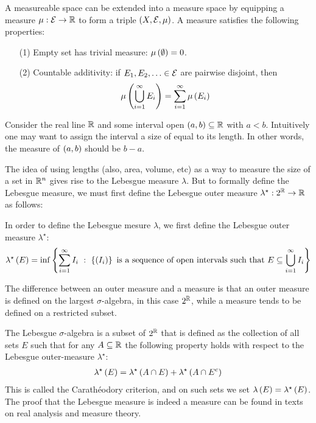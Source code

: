 A measureable space can be extended into a measure space by equipping a
measure \(\mu : \mathcal{E} \to \mathbb{R}\) to form a triple
\(\left(X, \mathcal{E}, \mu\right)\).
A measure satisfies the following properties:
\begin{enumerate}
  \item[(1)]
    Empty set has trivial measure: \(\mu\left(\emptyset\right) = 0\).

  \item[(2)]
    Countable additivity:
    if \(E_1, E_2, \ldots \in \mathcal{E}\) are pairwise disjoint, then
    \begin{align*}
      \mu\left(\bigcup_{i = 1}^{\infty} E_i\right)
        = \sum_{i = 1}^{\infty} \mu\left(E_i\right)
    \end{align*}

\end{enumerate}


\begin{example}
  Consider the real line \(\mathbb{R}\)
  and some interval open \(\left(a, b\right) \subseteq \mathbb{R}\) with \(a < b\).
  Intuitively one may want to assign the interval a size of
  equal to its length.
  In other words, the measure of \(\left(a, b\right)\) should be \(b - a\).

  The idea of using lengths (also, area, volume, etc) as a way to measure
  the size of a set in \(\mathbb{R}^n\) gives rise to the Lebesgue measure
  \(\lambda\).
  But to formally define the Lebesgue measure, we must first
  define the Lebesgue outer measure
  \(\lambda^\star : 2^{\mathbb{R}} \to \mathbb{R}\) as follows:
  
  In order to define the Lebesgue mesure \(\lambda\),
  we first define the Lebesgue outer measure \(\lambda^\star\):
  \begin{align*}
    \lambda^\star \parens{E}
      = \inf\braces{\sum_{i = 1}^{\infty} I_i \st
                      \braces{\parens{I_i}}
                      \ \text{is a sequence of open intervals such that} \ 
                      E \subseteq \bigcup_{i = 1}^{\infty} {I_i}}
  \end{align*}

  The difference between an outer measure and a measure is that
  an outer measure is defined on the largest \(\sigma\)-algebra,
  in this case \(2^{\mathbb{R}}\),
  while a measure tends to be defined on a restricted subset.

  The Lebesgue \(\sigma\)-algebra is a subset of \(2^{\mathbb{R}}\) that
  is defined as the collection of all sets \(E\) such that
  for any \(A \subseteq \mathbb{R}\) the following property holds with respect
  to the Lebesgue outer-measure \(\lambda^\star\):
  \begin{align*}
    \lambda^\star \left(E\right)
      = \lambda^\star \left(A \cap E\right) + \lambda^\star \left(A \cap E^c\right)
  \end{align*}
  This is called the Carath{\'e}odory criterion,
  and on such sets we set \(\lambda\left(E\right) = \lambda^\star \left(E\right)\).
  The proof that the Lebesgue measure is indeed a measure can be found
  in texts on real analysis and measure theory.

\end{example}



